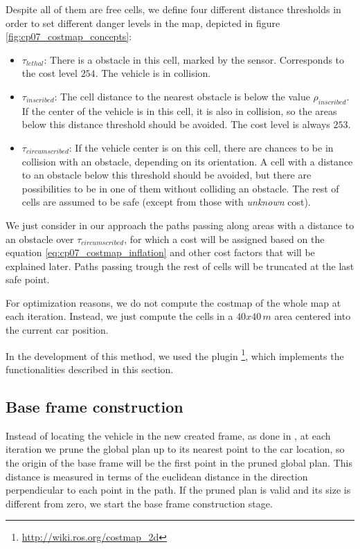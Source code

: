 Despite all of them are free cells, we define four different distance thresholds in order to set different danger levels in the map, depicted in figure \ref{fig:cp07_costmap_concepts}:

\begin{itemize}
 \item $\tau_{lethal}$: There is a obstacle in this cell, marked by the sensor. Corresponds to the cost level $254$. The vehicle is in collision.
 \item $\tau_{inscribed}$: The cell distance to the nearest obstacle is below the value $\rho_{inscribed}$. If the center of the vehicle is in this cell, it is also in collision, so the areas below this distance threshold should be avoided. The cost level is always $253$.
 \item $\tau_{circumscribed}$: If the vehicle center is on this cell, there are chances to be in collision with an obstacle, depending on its orientation. A cell with a distance to an obstacle below this threshold should be avoided, but there are possibilities to be in one of them without colliding an obstacle. The rest of cells are assumed to be safe (except from those with \emph{unknown} cost).
\end{itemize}

We just consider in our approach the paths passing along areas with a distance to an obstacle over $\tau_{circumscribed}$, for which a cost will be assigned based on the equation \ref{eq:cp07_costmap_inflation} and other cost factors that will be explained later. Paths passing trough the rest of cells will be truncated at the last safe point.

For optimization reasons, we do not compute the costmap of the whole map at each iteration. Instead, we just compute the cells in a $40x40\,m$ area centered into the current car position. 

In the development of this method, we used the \ROS plugin \footnote{\url{http://wiki.ros.org/costmap\_2d}}, which implements the functionalities described in this section. 

\subsection{Base frame construction}\label{ch:chapter07_01_02}

Instead of locating the vehicle in the new created frame, as done in \cite{chu2012local}, at each iteration we prune the global plan up to its nearest point to the car location, so the origin of the base frame will be the first point in the pruned global plan. This distance is measured in terms of the euclidean distance in the direction perpendicular to each point in the path. If the pruned plan is valid and its size is different from zero, we start the base frame construction stage.

